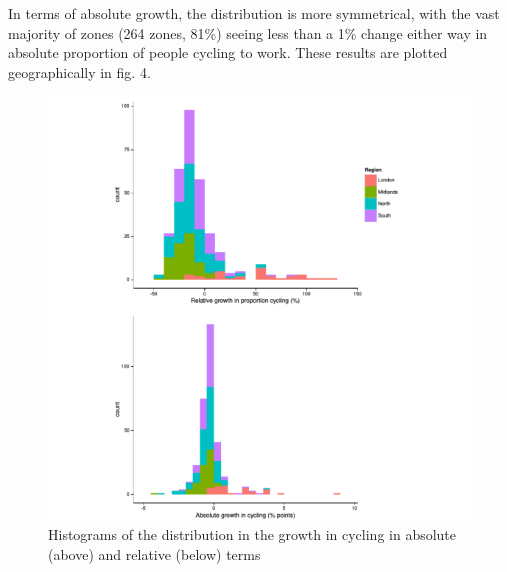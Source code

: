 In terms of absolute growth, the distribution is more symmetrical, with
the vast majority of zones (264 zones, 81\%) seeing less than a 1\%
change either way in absolute proportion of people cycling to work.
These results are plotted geographically in fig. 4.

\begin{figure}[htbp]
\centering
\includegraphics{figure/unnamed-chunk-6.png}
\caption{Histograms of the distribution in the growth in cycling in
absolute (above) and relative (below) terms}
\end{figure}


